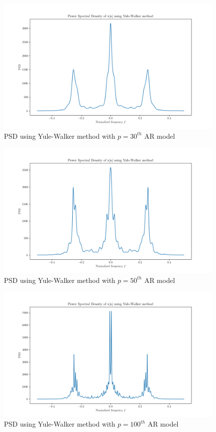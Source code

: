 \documentclass{article}
\begin{document}
\begin{figure}[!ht]
\includegraphics[width=\textwidth]{PSD_YW_30.png}
\caption{PSD using Yule-Walker method with $p=30^{th}$ AR model}
\label{fig:psdyw30}
\end{figure}

\begin{figure}[!ht]
\includegraphics[width=\textwidth]{PSD_YW_50.png}
\caption{PSD using Yule-Walker method with $p=50^{th}$ AR model}
\label{fig:psdyw50}
\end{figure}

\begin{figure}[!ht]
\includegraphics[width=\textwidth]{PSD_YW_100.png}
\caption{PSD using Yule-Walker method with $p=100^{th}$ AR model}
\label{fig:psdyw100}
\end{figure}
\end{document}
